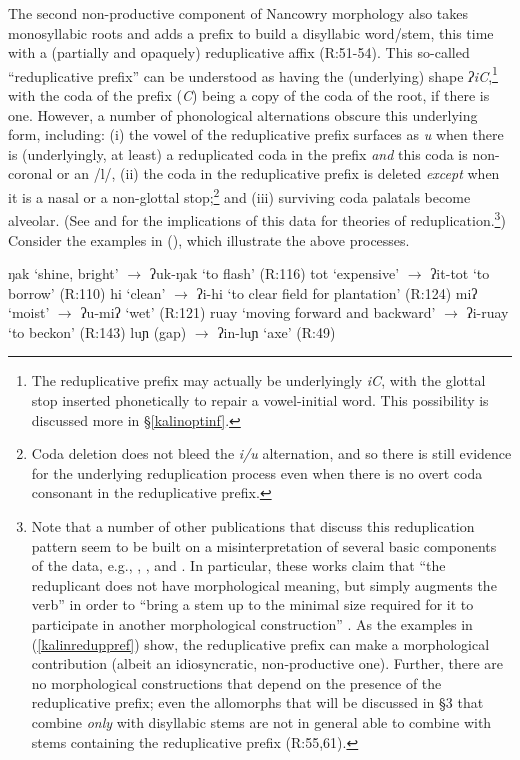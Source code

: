 \documentclass[output=paper,colorlinks,citecolor=brown,
]{langscibook}
\newcounter{nexttmp}    %
\newcommand{\Next}{\setcounter{nexttmp}{\value{equation}}\stepcounter{nexttmp}(\thenexttmp)\xspace}
\begin{document}
The second non-productive component of Nancowry morphology also takes monosyllabic roots and adds a prefix to build a disyllabic word/stem, this time with a (partially and opaquely) reduplicative affix (R:51-54). This so-called ``reduplicative prefix'' can be understood as having the (underlying) shape \textit{ʔiC},\footnote{The reduplicative prefix may actually be underlyingly \textit{iC}, with the glottal stop inserted phonetically to repair a vowel-initial word. This possibility is discussed more in \S\ref{kalinoptinf}.} with the coda of the prefix (\textit{C}) being a copy of the coda of the root, if there is one. However, a number of phonological alternations obscure this underlying form, including: (i)  the vowel of the reduplicative prefix surfaces as \textit{u} when there is (underlyingly, at least) a reduplicated coda in the prefix {\it and} this coda is non-coronal or an /l/, (ii) the coda in the reduplicative prefix is deleted {\it except} when it is a nasal or a non-glottal stop;\footnote{Coda deletion does {not} bleed the \textit{i/u} alternation, and so there is still evidence for the underlying reduplication process even when there is no overt coda consonant in the reduplicative prefix.} and (iii) surviving coda palatals become alveolar. (See \citealt[132ff.]{Steriade88} and \citealt[347ff.]{Alderete99} for the implications of this data for theories of reduplication.\footnote{Note that a number of other publications that discuss this reduplication pattern seem to be built on a misinterpretation of several basic components of the data, e.g., \citealt[247ff]{Hendricks99}, \citealt{Meek00}, and \citealt[223-224]{IZ05}. In particular, these works claim that ``the reduplicant does not have morphological meaning, but simply augments the verb'' \citep[58]{Hendricks99} in order to ``bring a stem up to the minimal size required for it to participate in another morphological construction'' \citep[200-201]{IZ05}. As the examples in (\ref{kalinreduppref}) show, the reduplicative prefix can make a morphological contribution (albeit an idiosyncratic, non-productive one). Further, there are no morphological constructions that depend on the presence of the reduplicative prefix; even the allomorphs that will be discussed in \S3 that combine {\it only} with disyllabic stems are not in general able to combine with stems containing the reduplicative prefix (R:55,61).}) Consider the examples in \Next, which illustrate the above processes.

\ea\label{kalinreduppref} 
\ea ŋak `shine, bright' $\rightarrow$ {ʔuk}-ŋak `to flash' \hfill (R:116)
\ex tot `expensive' $\rightarrow$ {ʔit}-tot `to borrow' \hfill (R:110)
\ex hi `clean' $\rightarrow$ {ʔi}-hi  `to clear field for plantation' \hfill (R:124)
\ex miʔ `moist' $\rightarrow$ {ʔu}-miʔ `wet' \hfill (R:121)
\ex ruay `moving forward and backward' $\rightarrow$ {ʔi}-ruay `to beckon' \hfill (R:143)
\ex *luɲ (gap) $\rightarrow$ {ʔin}-luɲ `axe' \hfill (R:49)\label{kalinaxegap}
\z
\z
\end{document}
